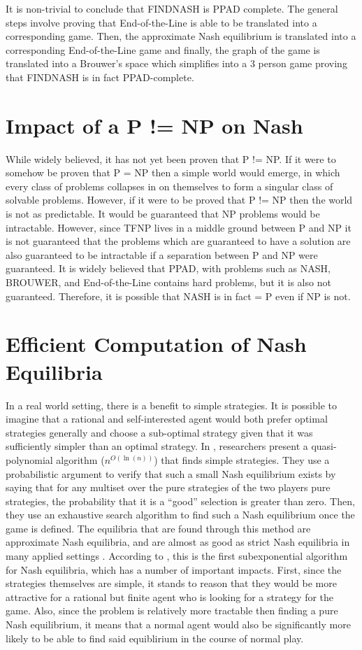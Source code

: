 \documentclass[10pt]{article}
\theoremstyle{definition}
\theoremstyle{remark}
\theoremstyle{definition}
\begin{document}
It is non-trivial to conclude that FINDNASH is PPAD complete. The general steps involve proving that End-of-the-Line is able to be translated into a corresponding game. Then, the approximate Nash equilibrium is translated into a corresponding End-of-the-Line game and finally, the graph of the game is translated into a Brouwer’s space which simplifies into a 3 person game proving that FINDNASH is in fact PPAD-complete. 

\section{Impact of a P != NP on Nash}
While widely believed, it has not yet been proven that P != NP. If it were to somehow be proven that P = NP then a simple world would emerge, in which every class of problems collapses in on themselves to form a singular class of solvable problems. However, if it were to be proved that P != NP then the world is not as predictable. It would be guaranteed that NP problems would be intractable. However, since TFNP lives in a middle ground between P and NP it is not guaranteed that the problems which are guaranteed to have a solution are also guaranteed to be intractable if a separation between P and NP were guaranteed. It is widely believed that PPAD, with problems such as NASH, BROUWER, and End-of-the-Line contains hard problems, but it is also not guaranteed. Therefore, it is possible that NASH is in fact = P even if NP is not. 

\section{Efficient Computation of Nash Equilibria}
In a real world setting, there is a benefit to simple strategies. It is possible to imagine that a rational and self-interested agent would both prefer optimal strategies generally and choose a sub-optimal strategy given that it was sufficiently simpler than an optimal strategy. In \cite{lipton2003playing}, researchers present a quasi-polynomial algorithm ($n^{O(\ln (n))}$) that finds simple strategies. They use a probabilistic argument to verify that such a small Nash equilibrium exists by saying that for any multiset over the pure strategies of the two players pure strategies, the probability that it is a “good” selection is greater than zero. Then, they use an exhaustive search algorithm to find such a Nash equilibrium once the game is defined. The equilibria that are found through this method are approximate Nash equilibria, and are almost as good as strict Nash equilibria in many applied settings \cite{lipton2003playing}. According to \cite{lipton2003playing}, this is the first subexponential algorithm for Nash equilibria, which has a number of important impacts. First, since the strategies themselves are simple, it stands to reason that they would be more attractive for a rational but finite agent who is looking for a strategy for the game. Also, since the problem is relatively more tractable then finding a pure Nash equilibrium, it means that a normal agent would also be significantly more likely to be able to find said equiblirium in the course of normal play. 




\end{document}
